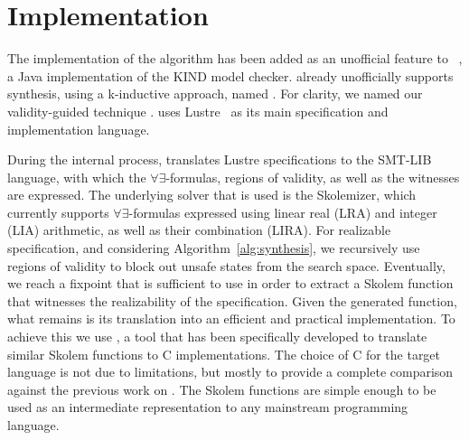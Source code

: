 \section{Implementation}
\label{sec:impl}

The implementation of the algorithm has been added as an
unofficial feature to \jkind~\cite{jkind}, a Java implementation of the
\textsc{KIND} model checker. \jkind already unofficially supports synthesis,
using a k-inductive approach, named \jsyn. For clarity, we named
our validity-guided technique \jsynvg. \jkind uses Lustre~\cite{lustrev6} as its main specification and implementation language.
\iffalse
, which functions as an intermediate representation to the Architecture Analysis and Design Language (\textsc{AADL})~\cite{feiler2006architecture}.
The latter is a high-level specification and analysis language with which
contracts are expressed, using the Assume-Guarantee Reasoning (\textsc{AGREE})
framework~\cite{NFM2012:CoGaMiWhLaLu}.
\andrew{it seems strange to be talking about AADL and maybe even AGREE  at all here.}

\fi

During the internal process, \jsynvg translates Lustre specifications to
the SMT-LIB language, with which the $\forall\exists$-formulas, regions of
validity, as well as the witnesses are expressed. The underlying solver that is
used is the \aeval Skolemizer, which currently supports
$\forall\exists$-formulas expressed using linear real (LRA) and integer (LIA) arithmetic, as well as
their combination (LIRA).
%
For realizable specification, and considering Algorithm~\ref{alg:synthesis}, we
recursively use regions of validity to block out unsafe states from the search
space.
Eventually, we reach a fixpoint that is sufficient to use in order to extract
a Skolem function that witnesses the realizability of the specification. Given
the generated function, what remains is its translation
into an efficient and practical implementation. To achieve this we use
\smtlibtoc, a tool that has been specifically developed to translate
similar \aeval Skolem functions to C implementations. The choice of C for
the target language is not due to limitations, but mostly to provide a complete
comparison against the previous work on \jsyn.
The Skolem functions are simple enough to be used as an intermediate
representation to any mainstream programming language.





